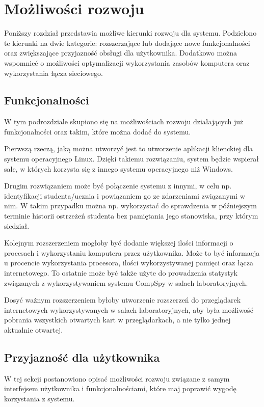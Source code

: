 \section{Możliwości rozwoju}

Poniższy rozdział przedstawia możliwe kierunki rozwoju dla systemu. Podzielono te kierunki na dwie kategorie: rozszerzające lub dodające nowe funkcjonalności oraz zwiększające przyjazność obsługi dla użytkownika. Dodatkowo można wspomnieć o możliwości optymalizacji wykorzystania zasobów komputera oraz wykorzystania łącza sieciowego. 

\subsection{Funkcjonalności}
W tym podrozdziale skupiono się na możliwościach rozwoju działających już funkcjonalności oraz takim, które można dodać do systemu.

    Pierwszą rzeczą, jaką można utworzyć jest to utworzenie aplikacji klienckiej dla systemu operacyjnego Linux. Dzięki takiemu rozwiązaniu, system będzie wspierał sale, w których korzysta się z innego systemu operacyjnego niż Windows.
    
    Drugim rozwiązaniem może być połączenie systemu z innymi, w celu np. identyfikacji studenta/ucznia i powiązaniem go ze zdarzeniami związanymi w nim. W takim przypadku można np. wykorzystać do sprawdzenia w późniejszym terminie historii ostrzeżeń studenta bez pamiętania jego stanowiska, przy którym siedział. 
    
    
    Kolejnym rozszerzeniem mogłoby być dodanie większej ilości informacji o procesach i wykorzystaniu komputera przez użytkownika. Może to być informacja u procencie wykorzystania procesora, ilości wykorzystywanej pamięci oraz łącza internetowego. To ostatnie może być także użyte do prowadzenia statystyk związanych z wykorzystywaniem systemu CompSpy w salach laboratoryjnych.
    
    
    Dosyć ważnym rozszerzeniem byłoby utworzenie rozszerzeń do przeglądarek internetowych wykorzystywanych w salach laboratoryjnych, aby była możliwość pobrania wszystkich otwartych kart w przeglądarkach, a nie tylko jednej aktualnie otwartej.
    
\newpage
\subsection{Przyjazność dla użytkownika}
W tej sekcji postanowiono opisać możliwości rozwoju związane z samym interfejsem użytkownika i funkcjonalnościami, które maj poprawić wygodę korzystania z systemu.


